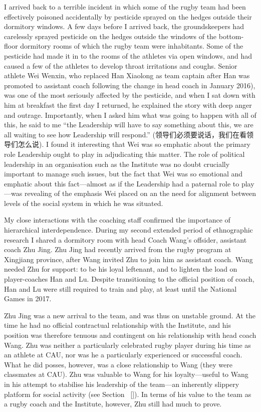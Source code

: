 \begin{CJK}{UTF8}{gbsn}
I arrived back to a terrible incident in which some of the rugby team had been effectively poisoned accidentally by pesticide sprayed on the hedges outside their dormitory windows.  A few days before I arrived back, the groundskeepers had carelessly sprayed pesticide on the hedges outside the windows of the bottom-floor dormitory rooms of which the rugby team were inhabitants.  Some of the pesticide had made it in to the rooms of the athletes via open windows, and had caused a few of the athletes to develop throat irritations and coughs.
Senior athlete Wei Wenxin, who replaced Han Xiaolong as team captain after Han was promoted to assistant coach following the change in head coach in January 2016), was one of the most seriously affected by the pesticide, and when I sat down with him at breakfast the first day I returned, he explained the story with deep anger and outrage.  Importantly, when I asked him what was going to happen with all of this, he said to me ``the Leadership will have to say something about this, we are all waiting to see how Leadership will respond.'' (领导们必须要说话，我们在看领导们怎么说).  I found it interesting that Wei was so emphatic about the primary role Leadership ought to play in adjudicating this matter.  The role of political leadership in an organisation such as the Institute was no doubt crucially important to manage such issues, but the fact that Wei was so emotional and emphatic about this fact---almost as if the Leadership had a paternal role to play---was revealing of the emphasis Wei placed on an the need for alignment between levels of the social system in which he was situated.

My close interactions with the coaching staff confirmed the importance of hierarchical interdependence.  During my second extended period of ethnographic research I shared a dormitory room with head Coach Wang's offsider, assistant coach Zhu Jing.  Zhu Jing had recently arrived from the rugby program at Xingjiang province, after Wang invited Zhu to join him as assistant coach.   Wang needed Zhu for support: to be his loyal leftenant, and to lighten the load on player-coaches Han and Lu. Despite transitioning to the official position of coach, Han and Lu were still required to train and play, at least until the National Games in 2017.

Zhu Jing was a new arrival to the team, and was thus on unstable ground. At the time he had no official contractual relationship with the Institute, and his position was therefore tenuous and contingent on his relationship with head coach Wang.  Zhu was neither a particularly celebrated rugby player during his time as an athlete at CAU, nor was he a particularly experienced or successful coach.  What he did posses, however, was a close relationship to Wang (they were classmates at CAU). Zhu was valuable to Wang for his loyalty---useful to Wang in his attempt to stabilise his leadership of the team---an inherently slippery platform for social activity (see Section ~\ref{}). In terms of his value to the team as a rugby coach and the Institute, however, Zhu still had much to prove.


\end{CJK}
